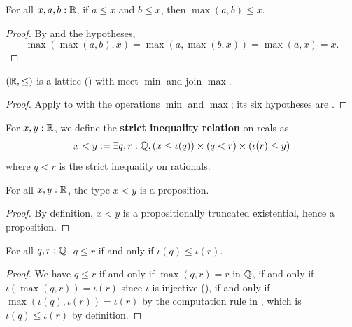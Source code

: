 \begin{lemma}
  \label{maxLUBReal}
  For all $x, a, b : \mathbb{R}$, if $a \le x$ and $b \le x$, then $\max(a, b) \le x$.
\end{lemma}
\begin{proof}
  By  and the hypotheses,
  \[
    \max(\max(a, b), x) = \max(a, \max(b, x)) = \max(a, x) = x.
  \]
\end{proof}

\begin{corollary}
  \label{RLePseudolattice}
  $(\mathbb{R}, \le)$ is a lattice () with meet $\min$ and join $\max$.
\end{corollary}
\begin{proof}
  Apply  to  with the operations $\min$ and $\max$; its six hypotheses are .
\end{proof}

\begin{definition}
  \label{ltReal}
  For $x, y : \mathbb{R}$, we define the \textbf{strict inequality relation} on reals as
  \[
    x < y := \exists q, r : \mathbb{Q},
    (x \le \iota(q)) \times (q < r) \times (\iota(r) \le y)
  \]
  where $q < r$ is the strict inequality on rationals.
\end{definition}

\begin{lemma}
  \label{isPropLtReal}
  For all $x, y : \mathbb{R}$, the type $x < y$ is a proposition.
\end{lemma}
\begin{proof}
  By definition, $x < y$ is a propositionally truncated existential, hence a proposition.
\end{proof}

\begin{lemma}
  \label{leIffRatLeReal}
  For all $q, r : \mathbb{Q}$, $q \le r$ if and only if $\iota(q) \le \iota(r)$.
\end{lemma}
\begin{proof}
  We have $q \le r$ if and only if $\max(q, r) = r$ in $\mathbb{Q}$, if and only if $\iota(\max(q, r)) = \iota(r)$ since $\iota$ is injective (), if and only if $\max(\iota(q), \iota(r)) = \iota(r)$ by the computation rule in , which is $\iota(q) \le \iota(r)$ by definition.
\end{proof}

